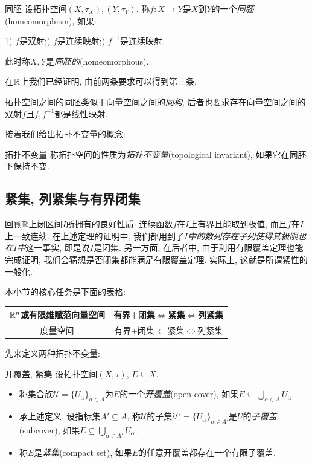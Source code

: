 \begin{definition}{同胚}
	设拓扑空间$(X,\tau _X),(Y,\tau _Y)$. 称$f:X \to Y$是$X$到$Y$的一个\textit{同胚}(homeomorphism), 如果: 
	
	1) $f$是双射;) $f$是连续映射;) $f^{-1}$是连续映射. 
	
	\noindent
	此时称$X,Y$是\textit{同胚的}(homeomorphous). 
\end{definition}

在$\mathbb{R}$上我们已经证明, 由前两条要求可以得到第三条. 

拓扑空间之间的同胚类似于向量空间之间的\textit{同构}, 后者也要求存在向量空间之间的双射$f$且$f,f^{-1}$都是线性映射. 

接着我们给出拓扑不变量的概念: 

\begin{definition}{拓扑不变量}
	称拓扑空间的性质为\textit{拓扑不变量}(topological invariant), 如果它在同胚下保持不变. 
\end{definition}

\subsection{紧集, 列紧集与有界闭集}

回顾$\mathbb{R}$上闭区间$I$所拥有的良好性质: 连续函数$f$在$I$上有界且能取到极值, 而且$f$在$I$上一致连续. 在上述定理的证明中, 我们都用到了\textit{$I$中的数列存在子列使得其极限也在$I$中}这一事实, 即是说$I$是闭集. 另一方面, 在后者中, 由于利用有限覆盖定理也能完成证明, 我们会猜想是否闭集都能满足有限覆盖定理. 实际上, 这就是所谓紧性的一般化. 

本小节的核心任务是下面的表格: 

\begin{table}[h]
	\centering
	\renewcommand\arraystretch{1.5}
	\begin{tabular}{|c|c|}
\hline
$\mathbb{R}^n$或有限维赋范向量空间 & 有界+闭集$\Longleftrightarrow$紧集$\Longleftrightarrow$列紧集 \\ \hline
度量空间             & 有界+闭集$\Longleftarrow$紧集$\Longleftrightarrow$列紧集      \\ \hline
\end{tabular}
\end{table}

先来定义两种拓扑不变量: 

\begin{definition}{开覆盖, 紧集}
	设拓扑空间$(X,\tau)$, $E \subseteq X$. 
	\begin{itemize}
		\item 称集合族$\mathcal{U} = \{ U_{\alpha} \}_{\alpha \in A}$为$E$的一个\textit{开覆盖}(open cover), 如果$E \subseteq \bigcup_{\alpha \in A} U_{\alpha}$. 
		\item 承上述定义, 设指标集$A' \subseteq A$, 称$\mathcal{U}$的子集$\mathcal{U}'= \{ U_{\alpha} \}_{\alpha \in A'}$是$U$的\textit{子覆盖}(subcover), 如果$E \subseteq \bigcup_{\alpha \in A'} U_{\alpha}$. 
		\item 称$E$是\textit{紧集}(compact set), 如果$E$的任意开覆盖都存在一个有限子覆盖. 
	\end{itemize}
\end{definition}

